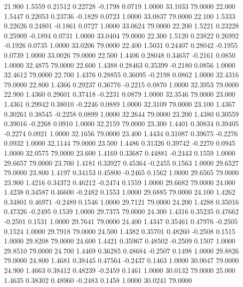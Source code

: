   21.900   1.5559   0.21512   0.22728  -0.1798   0.0719   1.0000  33.1033  79.0000
  22.000   1.5447   0.22053   0.23736  -0.1829   0.0723   1.0000  33.0837  79.0000
  22.100   1.5333   0.22626   0.24801  -0.1861   0.0727   1.0000  33.0624  79.0000
  22.200   1.5221   0.23228   0.25909  -0.1894   0.0731   1.0000  33.0404  79.0000
  22.300   1.5120   0.23822   0.26992  -0.1926   0.0735   1.0000  33.0206  79.0000
  22.400   1.5031   0.24407   0.28042  -0.1955   0.0739   1.0000  33.0026  79.0000
  22.500   1.4406   0.28048   0.34657  -0.2161   0.0850   1.0000  32.4875  79.0000
  22.600   1.4388   0.28463   0.35399  -0.2180   0.0856   1.0000  32.4612  79.0000
  22.700   1.4376   0.28855   0.36095  -0.2198   0.0862   1.0000  32.4316  79.0000
  22.800   1.4366   0.29237   0.36776  -0.2215   0.0870   1.0000  32.3953  79.0000
  22.900   1.4360   0.29601   0.37418  -0.2231   0.0879   1.0000  32.3546  79.0000
  23.000   1.4361   0.29942   0.38010  -0.2246   0.0889   1.0000  32.3109  79.0000
  23.100   1.4367   0.30261   0.38545  -0.2258   0.0899   1.0000  32.2644  79.0000
  23.200   1.4380   0.30559   0.39016  -0.2268   0.0910   1.0000  32.2159  79.0000
  23.300   1.4401   0.30834   0.39405  -0.2274   0.0921   1.0000  32.1656  79.0000
  23.400   1.4434   0.31087   0.39675  -0.2276   0.0932   1.0000  32.1144  79.0000
  23.500   1.4486   0.31326   0.39742  -0.2270   0.0945   1.0000  32.0575  79.0000
  23.600   1.4169   0.33687   0.44881  -0.2443   0.1559   1.0000  29.6657  79.0000
  23.700   1.4181   0.33927   0.45364  -0.2455   0.1563   1.0000  29.6527  79.0000
  23.800   1.4197   0.34153   0.45800  -0.2465   0.1562   1.0000  29.6565  79.0000
  23.900   1.4216   0.34372   0.46212  -0.2474   0.1559   1.0000  29.6682  79.0000
  24.000   1.4238   0.34587   0.46600  -0.2482   0.1553   1.0000  29.6885  79.0000
  24.100   1.4262   0.34801   0.46971  -0.2489   0.1546   1.0000  29.7121  79.0000
  24.200   1.4288   0.35016   0.47326  -0.2495   0.1539   1.0000  29.7375  79.0000
  24.300   1.4316   0.35235   0.47662  -0.2501   0.1531   1.0000  29.7641  79.0000
  24.400   1.4347   0.35461   0.47976  -0.2505   0.1524   1.0000  29.7918  79.0000
  24.500   1.4382   0.35701   0.48260  -0.2508   0.1515   1.0000  29.8208  79.0000
  24.600   1.4421   0.35967   0.48502  -0.2509   0.1507   1.0000  29.8510  79.0000
  24.700   1.4469   0.36285   0.48684  -0.2507   0.1498   1.0000  29.8826  79.0000
  24.800   1.4681   0.38445   0.47564  -0.2437   0.1463   1.0000  30.0047  79.0000
  24.900   1.4663   0.38412   0.48239  -0.2459   0.1461   1.0000  30.0132  79.0000
  25.000   1.4635   0.38302   0.48960  -0.2483   0.1458   1.0000  30.0241  79.0000
